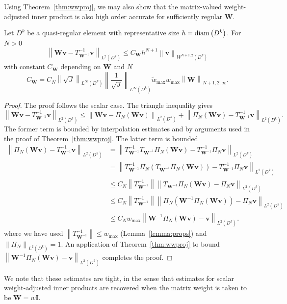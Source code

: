 \documentclass{siamart0216}
\newcommand{\nor}[1]{\left\| #1 \right\|}
\newcommand{\LRp}[1]{\left( #1 \right)}
\newcommand{\cond}[2]{\nor{#1}_{#2}\nor{{#1}^{-1}}_{#2}}
\newcommand{\Lk}{L^2\LRp{D^k}}
\newcommand{\LinfDk}{L^{\infty}\LRp{D^k}}
\begin{document}
Using Theorem~\ref{thm:wwproj}, we may also show that the matrix-valued weight-adjusted inner product is also high order accurate for sufficiently regular $\bm{W}$.
\begin{theorem}
Let $D^k$ be a quasi-regular element with representative size $h = {\rm diam}\LRp{D^k}$. For $N > 0$
\[
\nor{ \bm{W}\bm{v} - {T}^{-1}_{\bm{W}^{-1}}\bm{v} }_{\Lk } \leq C_{\bm{W}} h^{N+1} \nor{\bm{v}}_{W^{N+1,2}\LRp{D^k}}
\]
with constant $C_{\bm{W}}$ depending on $\bm{W}$ and $N$
\[
C_{\bm{W}} = C_N \nor{\sqrt{J}}_{\LinfDk}\nor{\frac{1}{\sqrt{J}}}_{\LinfDk} \tilde{w}_{\max}{w}_{\max} \nor{\bm{W}}_{{N+1,2,\infty}}.  
\]
\label{thm:west}
\end{theorem}
\begin{proof}
The proof follows the scalar case.  The triangle inequality gives
\[
\nor{ \bm{W}\bm{v} - {T}^{-1}_{\bm{W}^{-1}}\bm{v} }_{\Lk } \leq \nor{ \bm{W}\bm{v} - \Pi_N(\bm{W}\bm{v})}_{\Lk} + \nor{\Pi_N(\bm{W}\bm{v}) - T^{-1}_{\bm{W}^{-1}}\bm{v} }_{\Lk }.  
\]
The former term is bounded by interpolation estimates and by arguments used in the proof of Theorem~\ref{thm:wwproj}.  The latter term is bounded 
\begin{align*}
\nor{\Pi_N(\bm{W}\bm{v})- T^{-1}_{\bm{W}^{-1}}\bm{v} }_{\Lk} &= \nor{T^{-1}_{\bm{W}^{-1}} T_{\bm{W}^{-1}}\Pi_N(\bm{W}\bm{v})- T^{-1}_{\bm{W}^{-1}}\Pi_N\bm{v} }_{\Lk } \\
&= \nor{T^{-1}_{\bm{W}^{-1}} \Pi_N \LRp{T_{\bm{W}^{-1}}\Pi_N(\bm{W}\bm{v})}- T^{-1}_{\bm{W}^{-1}}\Pi_N\bm{v} }_{\Lk } \\
&\leq C_N \nor{T^{-1}_{\bm{W}^{-1}}} \nor{ T_{\bm{W}^{-1}}\Pi_N(\bm{W}\bm{v})-\Pi_N\bm{v} }_{\Lk }\\
&\leq C_N \nor{T^{-1}_{\bm{W}^{-1}}} \nor{ \Pi_N\LRp{\bm{W}^{-1}\Pi_N(\bm{W}\bm{v})} - \Pi_N\bm{v} }_{\Lk }\\
&\leq C_N {w}_{\max} \nor{ \bm{W}^{-1}\Pi_N(\bm{W}\bm{v}) - \bm{v} }_{\Lk }.
\end{align*}
where we have used $\nor{T_{\bm{W}^{-1}}^{-1}} \leq {w}_{\max}$ (Lemma~\ref{lemma:props}) and $\nor{\Pi_N}_{\Lk} = 1$.  
An application of Theorem~\ref{thm:wwproj} to bound $\nor{ \bm{W}^{-1}\Pi_N(\bm{W}\bm{v}) - \bm{v} }_{\Lk }$ completes the proof.
\end{proof}

We note that these estimates are tight, in the sense that estimates for scalar weight-adjusted inner products are recovered when the matrix weight is taken to be $\bm{W} = w\bm{I}$.  
\end{document}
